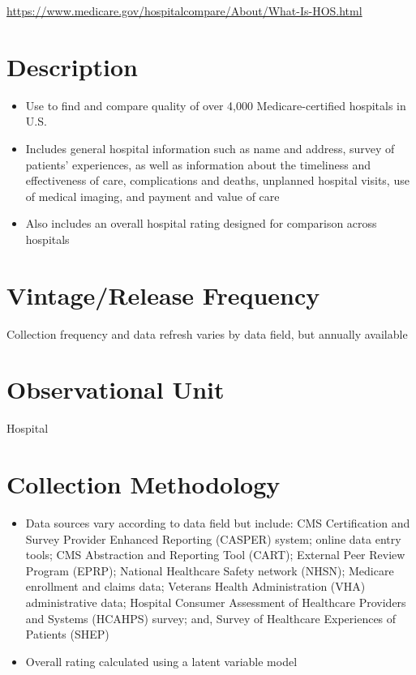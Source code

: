 \documentclass[
]{book}
\providecommand{\tightlist}{%
  \setlength{\itemsep}{0pt}\setlength{\parskip}{0pt}}
\begin{document}
\url{https://www.medicare.gov/hospitalcompare/About/What-Is-HOS.html}

\hypertarget{description-33}{%
\section{Description}\label{description-33}}

\begin{itemize}
\tightlist
\item
  Use to find and compare quality of over 4,000 Medicare-certified hospitals in U.S.
\item
  Includes general hospital information such as name and address, survey of patients' experiences, as well as information about the timeliness and effectiveness of care, complications and deaths, unplanned hospital visits, use of medical imaging, and payment and value of care
\item
  Also includes an overall hospital rating designed for comparison across hospitals
\end{itemize}

\hypertarget{vintagerelease-frequency-33}{%
\section{Vintage/Release Frequency}\label{vintagerelease-frequency-33}}

Collection frequency and data refresh varies by data field, but annually available

\hypertarget{observational-unit-33}{%
\section{Observational Unit}\label{observational-unit-33}}

Hospital

\hypertarget{collection-methodology-33}{%
\section{Collection Methodology}\label{collection-methodology-33}}

\begin{itemize}
\tightlist
\item
  Data sources vary according to data field but include: CMS Certification and Survey Provider Enhanced Reporting (CASPER) system; online data entry tools; CMS Abstraction and Reporting Tool (CART); External Peer Review Program (EPRP); National Healthcare Safety network (NHSN); Medicare enrollment and claims data; Veterans Health Administration (VHA) administrative data; Hospital Consumer Assessment of Healthcare Providers and Systems (HCAHPS) survey; and, Survey of Healthcare Experiences of Patients (SHEP)
\item
  Overall rating calculated using a latent variable model
\end{itemize}
\end{document}
